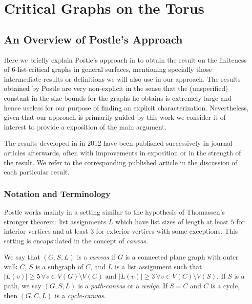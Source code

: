 \chapter{Critical Graphs on the Torus}


\section{An Overview of Postle's Approach}

Here we briefly explain Postle's approach in \cite{postlethesis} to obtain the result on the finiteness of 6-list-critical graphs in general surfaces, mentioning specially those intermediate results or definitions we will also use in our approach. The results obtained by Postle are very non-explicit in the sense that the (unspecified) constant in the size bounds for the graphs he obtains is extremely large and hence useless for our purpose of finding an explicit characterization. Nevertheless, given that our approach is primarily guided by this work we consider it of interest to provide a exposition of the main argument.

The results developed in \cite{postlethesis} in 2012 have been published successively in journal articles afterwards, often with improvements in exposition or in the strength of the result. We refer to the corresponding published article in the discussion of each particular result.

\subsection{Notation and Terminology}

Postle works mainly in a setting similar to the hypothesis of Thomassen's stronger theorem: list assignments $L$ which have list sizes of length at least $5$ for interior vertices and at least $3$ for exterior vertices with some exceptions. This setting is encapsulated in the concept of \emph{canvas}.

\begin{definition}[Canvas]
We say that $(G, S, L)$ is a \emph{canvas} if $G$ is a connected plane graph
 with outer walk $C$, $S$ is a subgraph of $C$, and $L$ is a list assignment
  such that $|L(v)| \geq 5 \, \forall v \in V(G) \setminus V(C)$ and
   $|L(v)| \geq 3 \, \forall v \in V(C) \setminus V(S)$. If $S$ is a path,
    we say $(G, S, L)$ is a \emph{path-canvas} or a \emph{wedge}. If $S = C$ and 
    $C$ is a cycle, then $(G, C, L)$ is a \emph{cycle-canvas}.
\end{definition} 




